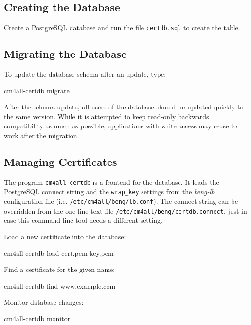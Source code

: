 \documentclass[a4paper,12pt]{article}
\begin{document}
\subsection{Creating the Database}

Create a PostgreSQL database and run the file \texttt{certdb.sql} to
create the table.

\subsection{Migrating the Database}

To update the database schema after an update, type:

\begin{verbatim*}
cm4all-certdb migrate
\end{verbatim*}

After the schema update, all users of the database should be updated
quickly to the same version.  While it is attempted to keep read-only
backwards compatibility as much as possible, applications with write
access may cease to work after the migration.

\subsection{Managing Certificates}

The program \texttt{cm4all-certdb} is a frontend for the database.  It
loads the PostgreSQL connect string and the \verb|wrap_key| settings
from the \emph{beng-lb} configuration file
(i.e. \texttt{/etc/cm4all/beng/lb.conf}).  The connect string can be
overridden from the one-line text file
\texttt{/etc/cm4all/beng/certdb.connect}, just in case this
command-line tool needs a different setting.

Load a new certificate into the database:

\begin{verbatim*}
cm4all-certdb load cert.pem key.pem
\end{verbatim*}

Find a certificate for the given name:

\begin{verbatim*}
cm4all-certdb find www.example.com
\end{verbatim*}

Monitor database changes:

\begin{verbatim*}
cm4all-certdb monitor
\end{verbatim*}
\end{document}

